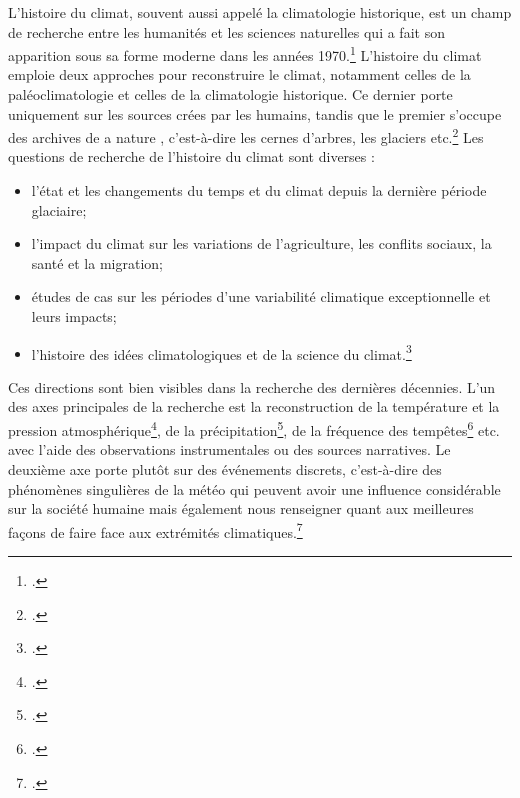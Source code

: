 \documentclass[a4paper,twoside,12pt]{article}
\begin{document}
L'histoire du climat, souvent aussi appelé la climatologie historique, est un champ de recherche entre les humanités et les sciences naturelles qui a fait son apparition sous sa forme moderne dans les années 1970.\footcite[Les origines de l'histoire du climat dépendent de la définition que l'on donne au terme \og climat \fg{} qui a subi une transformation importante pendant l'époque moderne. Il est vrai que les savants européens s'ont occupe de la question du temps, l'atmosphère etc. et leur influence sur l'humain déjà depuis de l'antiquité, mais le manque d'une distinction nette entre les aspects physiques et astrologiques, etc. du temps rend difficile l'examination du domaine comme une tradition continue de recherche. Pour une histoire longue de la climatologie, cf. l'excellente synthèse de Franz Mauelshagen dans][]{white_palgrave_2018} L'histoire du climat emploie deux approches pour reconstruire le climat, notamment celles de la paléoclimatologie et celles de la climatologie historique. Ce dernier porte uniquement sur les sources crées par les humains, tandis que le premier s'occupe des \og archives de a nature \fg{}, c'est-à-dire les cernes d'arbres, les glaciers etc.\footcite[][2]{white_palgrave_2018} Les questions de recherche de l'histoire du climat sont diverses :
\vspace{1ex}
\begin{itemize}[label=$\bullet$]
    \item l'état et les changements du temps et du climat depuis la dernière période glaciaire;
    \item l'impact du climat sur les variations de l'agriculture, les conflits sociaux, la santé et la migration;
    \item études de cas sur les périodes d'une variabilité climatique exceptionnelle et leurs impacts;
    \item l'histoire des idées climatologiques et de la science du climat.\footcite[][1-2]{white_palgrave_2018}
\end{itemize}
\vspace{1ex}

Ces directions sont bien visibles dans la recherche des dernières décennies. L'un des axes principales de la recherche est la reconstruction de la température et la pression atmosphérique\footcites{jones_monthly_1999}{camuffo_daily_2002}{camuffo_daily_2002-1}{camuffo_daily_2002-2}, de la précipitation\footcites{fenby_rainfall_2013}, de la fréquence des tempêtes\footcites{jones_preliminary_2005}{barring_scandinavian_2004}{wheeler_atmospheric_2010}{von_storch_storm_2008} etc. avec l'aide des observations instrumentales ou des sources narratives. Le deuxième axe porte plutôt sur des événements discrets, c'est-à-dire des phénomènes singulières de la météo qui peuvent avoir une influence considérable sur la société humaine mais également nous renseigner quant aux meilleures façons de faire face aux extrémités climatiques.\footcites{fredriksson_using_2018}{wheeler_great_2003}{garnier_historical_2018}{brazdil_chronology_2000}{pfister_meteorological_2010}
\end{document}

